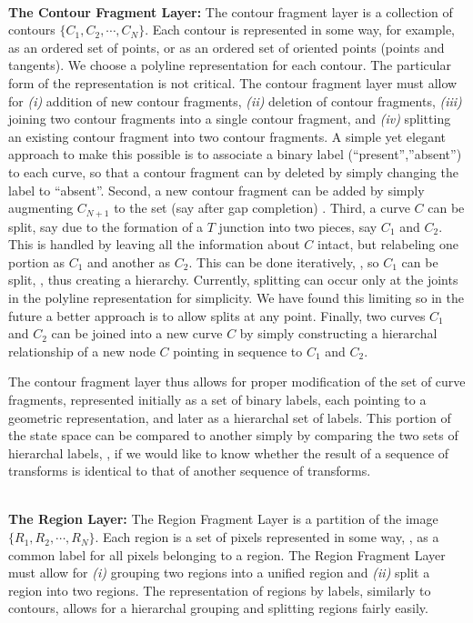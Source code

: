 \noindent\\
{\bf The Contour Fragment Layer: } The contour fragment layer is a collection of contours $\{C_1,C_2,\cdots,C_N\}$. Each contour is represented in some way, for example, as an ordered set of points, or as an ordered set of oriented points (points and tangents). We choose a polyline representation for each contour. The particular form of the representation is not critical. The contour fragment layer must allow for \emph{(i)} addition of new contour fragments, \emph{(ii)} deletion of contour fragments, \emph{(iii)} joining two contour fragments into a single contour fragment, and \emph{(iv)} splitting an existing contour fragment into two contour fragments. A simple yet elegant approach to make this possible is to associate a binary label (``present'',''absent'') to each curve, so that a contour fragment can by deleted by simply changing the label to ``absent''. Second, a new contour fragment can be added by simply augmenting $C_{N+1}$ to the set (say after gap completion) . Third, a curve $C$ can be split, say due to the formation of a $T$ junction into two pieces, say $C_1$ and $C_2$. This is handled by leaving all the information about $C$ intact, but relabeling one portion as $C_1$ and another as $C_2$. This can be done iteratively, \eg, so $C_1$ can be split, \etc, thus creating a hierarchy. Currently, splitting can occur only at the joints in the polyline representation for simplicity. We have found this limiting so in the future a better approach is to allow splits at any point. Finally, two curves $C_1$ and $C_2$ can be joined into a new curve $C$ by simply constructing a hierarchal relationship of a new node $C$ pointing in sequence to $C_1$ and $C_2$. 

The contour fragment layer thus allows for proper modification of the set of curve fragments, represented initially as a set of binary labels, each pointing to a geometric representation, and later as a hierarchal set of labels. This portion of the state space can be compared to another simply by comparing the two sets of hierarchal labels, \eg, if we would like to know whether the result of a sequence of transforms is identical to that of another sequence of transforms. 

\noindent\\
{\bf The Region Layer: } The Region Fragment Layer is a partition of the image $\{R_1,R_2,\cdots,R_N\}$. Each region is a set of pixels represented in some way, \eg, as a common label for all pixels belonging to a region. The Region Fragment Layer must allow for \emph{(i)} grouping two regions into a unified region and \emph{(ii)} split a region into two regions. The representation of regions by labels, similarly to contours, allows for a hierarchal grouping and splitting regions fairly easily. 

